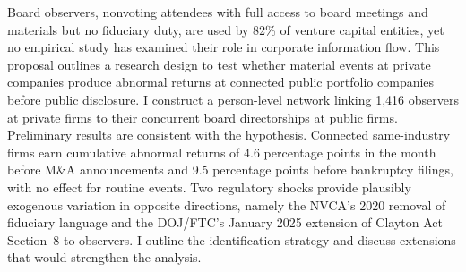 Board observers, nonvoting attendees with full access to board meetings and materials but no fiduciary duty, are used by 82\% of venture capital entities, yet no empirical study has examined their role in corporate information flow. This proposal outlines a research design to test whether material events at private companies produce abnormal returns at connected public portfolio companies before public disclosure. I construct a person-level network linking 1,416 observers at private firms to their concurrent board directorships at public firms. Preliminary results are consistent with the hypothesis. Connected same-industry firms earn cumulative abnormal returns of 4.6 percentage points in the month before M\&A announcements and 9.5 percentage points before bankruptcy filings, with no effect for routine events. Two regulatory shocks provide plausibly exogenous variation in opposite directions, namely the NVCA's 2020 removal of fiduciary language and the DOJ/FTC's January 2025 extension of Clayton Act Section~8 to observers. I outline the identification strategy and discuss extensions that would strengthen the analysis.